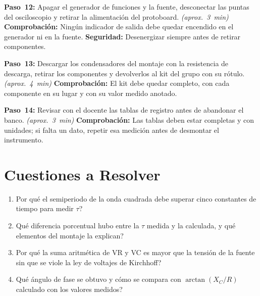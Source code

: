 \documentclass[12pt]{article}
\begin{document}
\begin{pasos}
  \item \textbf{Paso~12:} Apagar el generador de funciones y la fuente, desconectar las puntas del osciloscopio y retirar la alimentación del protoboard. \emph{(aprox.~\SI{3}{\minute})} \textbf{Comprobación:} Ningún indicador de salida debe quedar encendido en el generador ni en la fuente. \textbf{Seguridad:} Desenergizar siempre antes de retirar componentes.
  \item \textbf{Paso~13:} Descargar los condensadores del montaje con la resistencia de descarga, retirar los componentes y devolverlos al kit del grupo con su rótulo. \emph{(aprox.~\SI{4}{\minute})} \textbf{Comprobación:} El kit debe quedar completo, con cada componente en su lugar y con su valor medido anotado.
  \item \textbf{Paso~14:} Revisar con el docente las tablas de registro antes de abandonar el banco. \emph{(aprox.~\SI{3}{\minute})} \textbf{Comprobación:} Las tablas deben estar completas y con unidades; si falta un dato, repetir esa medición antes de desmontar el instrumento.
\end{pasos}

\section{Cuestiones a Resolver}\label{sec:cuestiones}
\begin{enumerate}
  \item \textquestiondown{}Por qué el semiperiodo de la onda cuadrada debe superar cinco constantes de tiempo para medir \ensuremath{\tau}?
  \item \textquestiondown{}Qué diferencia porcentual hubo entre la \ensuremath{\tau} medida y la calculada, y qué elementos del montaje la explican?
  \item \textquestiondown{}Por qué la suma aritmética de VR y VC es mayor que la tensión de la fuente sin que se viole la ley de voltajes de Kirchhoff?
  \item \textquestiondown{}Qué ángulo de fase se obtuvo y cómo se compara con $\arctan(X_C/R)$ calculado con los valores medidos?
\end{enumerate}

\end{document}
